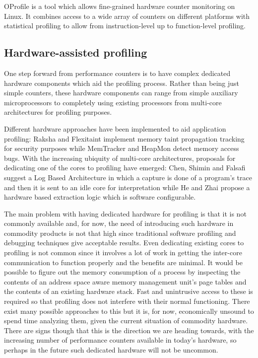 OProfile is a tool which allows fine-grained hardware counter monitoring on Linux. It combines access to a wide array of counters on different platforms with statistical profiling to allow from instruction-level up to function-level profiling.

\subsection{Hardware-assisted profiling}
\label{subsection:hardwareassistedprofiling}

One step forward from performance counters is to have complex dedicated hardware components which aid the profiling process. Rather than being just simple counters, these hardware components can range from simple auxiliary microprocessors to completely using existing processors from multi-core architectures for profiling purposes.

Different hardware approaches have been implemented to aid application profiling: Raksha\cite{Dalton07} and Flexitaint\cite{Venkataramani08} implement memory taint propagation tracking for security purposes while MemTracker\cite{Venkataramani07} and HeapMon\cite{Shetty06} detect memory access bugs. With the increasing ubiquity of multi-core architectures, proposals for dedicating one of the cores to profiling have emerged: Chen, Shimin and Falsafi\cite{Chen06} suggest a Log Based Architecture in which a capture is done of a program's trace and then it is sent to an idle core for interpretation while He and Zhai\cite{He_ex} propose a hardware based extraction logic which is software configurable.

The main problem with having dedicated hardware for profiling is that it is not commonly available and, for now, the need of introducing such hardware in commodity products is not that high since traditional software profiling and debugging techniques give acceptable results. Even dedicating existing cores to profiling is not common since it involves a lot of work in getting the inter-core communication to function properly and the benefits are minimal. It would be possible to figure out the memory consumption of a process by inspecting the contents of an address space aware memory management unit's page tables and the contents of an existing hardware stack. Fast and unintrusive access to these is required so that profiling does not interfere with their normal functioning. There exist many possible approaches to this but it is, for now, economically unsound to spend time analyzing them, given the current situation of commodity hardware. There are signs though that this is the direction we are heading towards, with the increasing number of performance counters available in today's hardware, so perhaps in the future such dedicated hardware will not be uncommon.


